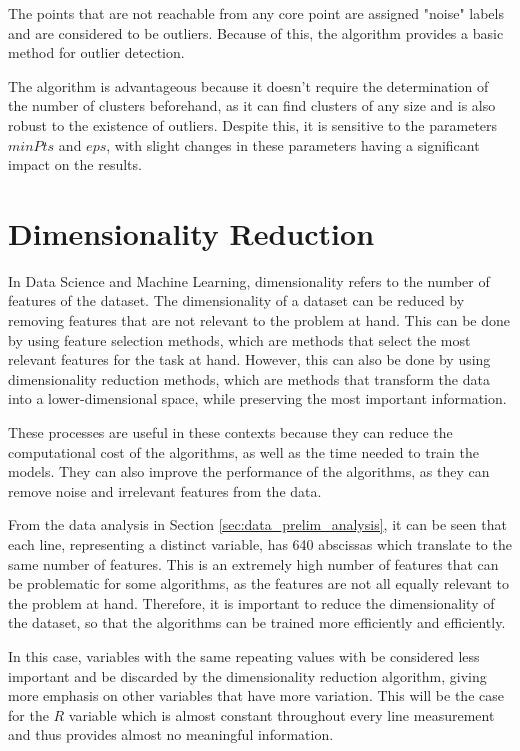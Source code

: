The points that are not reachable from any core point are assigned "noise" labels and are considered to be outliers. Because of this, the algorithm provides a basic method for outlier detection.

The algorithm is advantageous because it doesn't require the determination of the number of clusters beforehand, as it can find clusters of any size and is also robust to the existence of outliers. Despite this, it is sensitive to the parameters $minPts$ and $eps$, with slight changes in these parameters having a significant impact on the results.

\section{Dimensionality Reduction}\label{sec:dim_reduction}
In Data Science and Machine Learning, dimensionality refers to the number of features of the dataset. The dimensionality of a dataset can be reduced by removing features that are not relevant to the problem at hand. This can be done by using feature selection methods, which are methods that select the most relevant features for the task at hand. However, this can also be done by using dimensionality reduction methods, which are methods that transform the data into a lower-dimensional space, while preserving the most important information.

These processes are useful in these contexts because they can reduce the computational cost of the algorithms, as well as the time needed to train the models. They can also improve the performance of the algorithms, as they can remove noise and irrelevant features from the data.

From the data analysis in Section \ref{sec:data_prelim_analysis}, it can be seen that each line, representing a distinct variable, has 640 abscissas which translate to the same number of features. This is an extremely high number of features that can be problematic for some algorithms, as the features are not all equally relevant to the problem at hand. Therefore, it is important to reduce the dimensionality of the dataset, so that the algorithms can be trained more efficiently and efficiently. 

In this case, variables with the same repeating values with be considered less important and be discarded by the dimensionality reduction algorithm, giving more emphasis on other variables that have more variation. This will be the case for the $R$ variable which is almost constant throughout every line measurement and thus provides almost no meaningful information.

